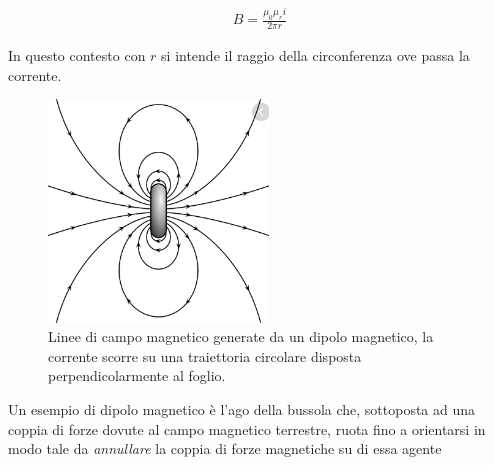 \documentclass[17pt]{extarticle}
\begin{document}
\begin{enumerate}
\begin{eqnarray}\label{eq:B1}
	B = \frac{\mu_0\mu_r i}{2\pi r}
\end{eqnarray}







In questo contesto con $r$ si intende il raggio della circonferenza ove passa la corrente.





\begin{figure}[bh!]
	\centering
   	\includegraphics[width=2.3in]{dipoloMagnetico.png}%
  	\caption{Linee di campo magnetico generate da un dipolo magnetico, la corrente scorre su una traiettoria circolare disposta perpendicolarmente al foglio.}
   	\label{fig:dipoloMagnetico}%
\end{figure}



Un esempio di dipolo magnetico è l'ago della bussola che, sottoposta ad una coppia di forze dovute al campo magnetico terrestre, ruota fino a orientarsi in modo tale da \emph{annullare} la coppia di forze magnetiche su di essa agente


\end{enumerate}
\end{document}
